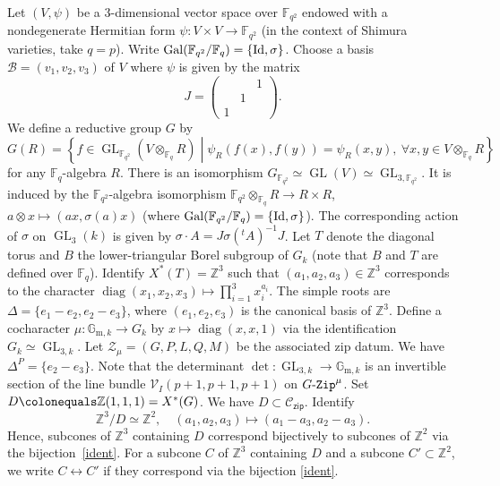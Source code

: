 \documentclass[11pt]{amsart}
\numberwithin{equation}{section}
\theoremstyle{definition}
\theoremstyle{remark}
\newcommand{\GZip}{\mathop{\text{$G$-{\tt Zip}}}\nolimits}
\newcommand{\zipsf}{\mathsf{zip}}
\newcommand{\Bcal}{{\mathcal B}}
\newcommand{\Ccal}{{\mathcal C}}
\newcommand{\Vcal}{{\mathcal V}}
\newcommand{\Zcal}{{\mathcal Z}}
\newcommand{\FF}{\mathbb{F}}
\newcommand{\GG}{\mathbb{G}}
\newcommand{\ZZ}{\mathbb{Z}}
\DeclareMathOperator{\Gal}{Gal}
\DeclareMathOperator{\GL}{GL}
\newcommand{\id}{{\rm Id}}
\DeclareMathOperator{\diag}{diag}
\newcommand{\relmiddle}[1]{\mathrel{}\middle#1\mathrel{}}
\begin{document}
Let $(V,\psi)$ be a $3$-dimensional vector space over $\FF_{q^2}$ endowed with a nondegenerate Hermitian form $\psi \colon V\times V\to \FF_{q^2}$ (in the context of Shimura varieties, take $q=p$). Write $\Gal(\FF_{q^2}/\FF_q)=\{\id,\sigma\}$. Choose a basis $\Bcal=(v_1,v_2,v_3)$ of $V$ where $\psi$ is given by the matrix 
\[
 J= \begin{pmatrix}
&&1\\&1&\\1&&\end{pmatrix}. 
\]
We define a reductive group $G$ by
\begin{equation}
G(R) = \left\{f\in \GL_{\FF_{q^2}}\left(V\otimes_{\FF_q} R\right) \relmiddle|  \psi_R(f(x),f(y))=\psi_R(x,y), \ \forall x,y\in V\otimes_{\FF_q} R \right\}
\end{equation}
for any $\FF_q$-algebra $R$.  There is an isomorphism $G_{\FF_{q^2}}\simeq \GL(V)\simeq \GL_{3,\FF_{q^2}}$. It is induced by the $\FF_{q^2}$-algebra isomorphism $\FF_{q^2}\otimes_{\FF_q} R\to R\times R$, $a\otimes x\mapsto (ax,\sigma(a)x)$ (where $\Gal(\FF_{q^2}/\FF_q)=\{\id, \sigma\}$). The corresponding action of $\sigma$ on $\GL_3(k)$ is given by $\sigma\cdot A = J \sigma({}^t \!A)^{-1}J$. Let $T$ denote the diagonal torus and $B$ the lower-triangular Borel subgroup of $G_k$ (note that $B$ and $T$ are defined over $\FF_q$). Identify $X^*(T)=\ZZ^3$ such that $(a_1,a_2,a_3)\in \ZZ^3$ corresponds to the character $\diag(x_1,x_2 ,x_3)\mapsto \prod_{i=1}^3 x_i^{a_i}$. The simple roots are $\Delta=\{e_1-e_{2}, e_2-e_3\}$, where $(e_1, e_2 ,e_3)$ is the canonical basis of $\ZZ^3$. Define a cocharacter $\mu  \colon  \GG_{\mathrm{m},k}\to G_{k}$ by $x\mapsto \diag(x,x,1)$ via the identification $G_{k}\simeq \GL_{3,k}$. Let $\Zcal_{\mu}=(G,P,L,Q,M)$ be the associated zip datum. We have $\Delta^P=\{e_2-e_3\}$. Note that the determinant $\det\colon \GL_{3,k}\to \GG_{\textrm{m},k}$ is an invertible section of the line bundle $\Vcal_I(p+1,p+1,p+1)$ on $\GZip^\mu$. Set $D\colonequals \ZZ(1,1,1)=X^*(G)$. 
We have $D \subset \Ccal_{\zipsf}$. Identify
\begin{equation}\label{ident}
\ZZ^3/D\simeq \ZZ^2, \quad (a_1,a_2,a_3)\longmapsto (a_1-a_3,a_2-a_3).
\end{equation}
Hence, subcones of $\ZZ^3$ containing $D$ correspond bijectively to subcones of $\ZZ^2$ via the bijection~\eqref{ident}. For a subcone $C$ of $\ZZ^3$ containing $D$ and a subcone $C'\subset \ZZ^2$, we write $C\leftrightarrow C'$ if they correspond via the bijection \eqref{ident}.
\end{document}
